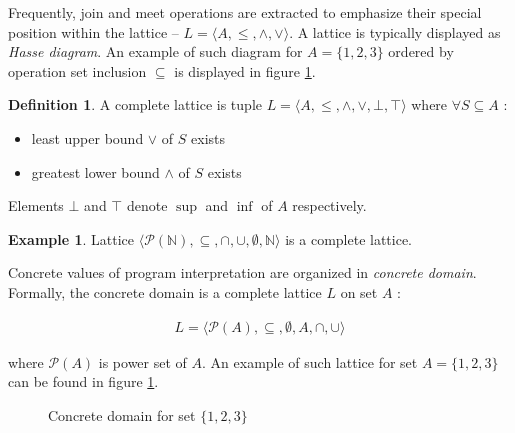 \documentclass[12pt,final,oneside]{fithesis2}
\theoremstyle{definition}
\newtheorem{definition}{Definition}
\newtheorem{example}{Example}
\begin{document}
Frequently, join and meet operations are extracted to emphasize their
special position within the lattice --
$L = \langle A, \leq, \land, \lor \rangle$.
A lattice is typically displayed as \textit{Hasse diagram}. An example
of such diagram for $A = \{ 1, 2, 3\}$ ordered by operation set inclusion
$\subseteq$ is displayed in figure \ref{fig:concretedomain}.

\begin{definition}
A complete lattice is tuple $L = \langle A, \leq, \land, \lor, \bot, \top \rangle$
where $\forall S \subseteq A$ :

\begin{itemize}
\item least upper bound $\lor$ of $S$ exists
\item greatest lower bound $\land$ of $S$ exists
\end{itemize}

Elements $\bot$ and $\top$ denote $\sup$ and $\inf$ of $A$ respectively.
\end{definition}

\begin{example}
Lattice $\langle \mathcal{P}(\mathbb{N}), \subseteq, \cap, \cup, \emptyset, \mathbb{N} \rangle$
is a complete lattice.
\end{example}

Concrete values of program interpretation are organized in \textit{concrete
domain}. Formally, the concrete domain is a complete lattice $L$ on set
$A$ \cite{Constantini11-1}:

\begin{align*}
L = \langle \mathcal{P} (A), \subseteq, \emptyset, A, \cap, \cup \rangle
\end{align*}

where $\mathcal{P} (A)$ is power set of $A$. An example of such lattice
for set $A = \{ 1, 2, 3 \}$ can be found in figure \ref{fig:concretedomain}.

\begin{figure}[ht]
\centering
{}
\caption{Concrete domain for set $\{ 1, 2, 3 \}$}
\label{fig:concretedomain}
\end{figure}
\end{document}
